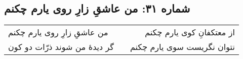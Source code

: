 \begin{center}
\section*{شماره ۳۱: من عاشقِ زارِ روی یارم چکنم}
\label{sec:031}
\begin{longtable}{l p{0.5cm} r}
من عاشقِ زارِ روی یارم چکنم
&&
از معتکفانِ کوی یارم چکنم
\\
گر دیدهٔ من شوند ذرّات دو کون
&&
نتوان نگریست سوی یارم چکنم
\\
\end{longtable}
\end{center}
